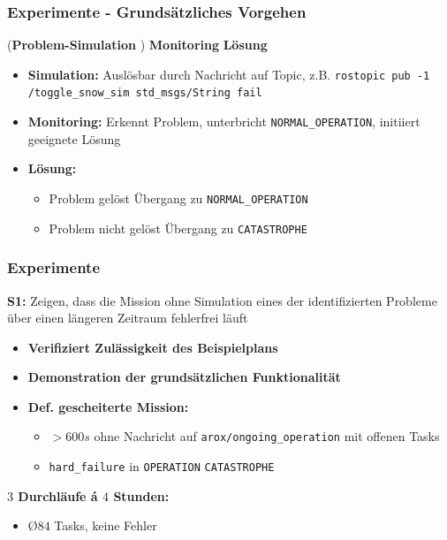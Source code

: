 \documentclass{beamer}
\newcommand{\code}[1]{\colorbox{light-gray}{\texttt{#1}}}
\begin{document}
\begin{frame}
  \frametitle{Experimente - Grundsätzliches Vorgehen}
  (\textbf{Problem-Simulation} \textrightarrow) \thinspace \textbf{Monitoring} \textrightarrow \thinspace \textbf{Lösung}
  \begin{itemize}
    \item \textbf{Simulation:} Auslösbar durch Nachricht auf Topic, z.B. \code{rostopic pub -1 /toggle\_snow\_sim std\_msgs/String fail}
    \item \textbf{Monitoring:} Erkennt Problem, unterbricht \code{NORMAL\_OPERATION}, initiiert geeignete Lösung
    \item \textbf{Lösung:}
    \begin{itemize}
      \item Problem gelöst \textrightarrow \thinspace Übergang zu \code{NORMAL\_OPERATION}
      \item Problem nicht gelöst \textrightarrow \thinspace Übergang zu \code{CATASTROPHE}
    \end{itemize}
  \end{itemize}
\end{frame}

\begin{frame}
  \frametitle{Experimente}
  \textbf{S1:} Zeigen, dass die Mission ohne Simulation eines der identifizierten Probleme über einen längeren Zeitraum fehlerfrei läuft
  \begin{itemize}
    \item \textbf{Verifiziert Zulässigkeit des Beispielplans}
    \item \textbf{Demonstration der grundsätzlichen Funktionalität}
    \item \textbf{Def. gescheiterte Mission:}
    \begin{itemize}
      \item $> 600s$ ohne Nachricht auf \code{arox/ongoing\_operation} mit offenen Tasks
      \item \code{hard\_failure} in \code{OPERATION} \textrightarrow \thinspace \code{CATASTROPHE}
    \end{itemize}
  \end{itemize}
  \textbf{$3$ Durchläufe á $4$ Stunden:}
  \begin{itemize}
    \item \O $84$ Tasks, keine Fehler
  \end{itemize}
\end{frame}
\end{document}
